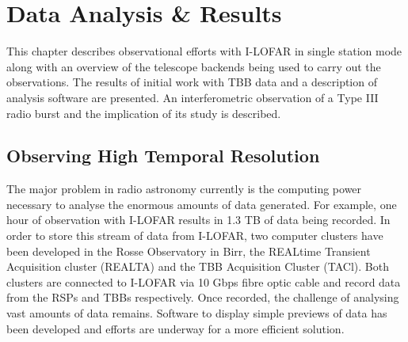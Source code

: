 
%
%



\onehalfspacing
\chapter{Data Analysis \& Results}
\label{chap:obs}
This chapter describes observational efforts with I-LOFAR in single station mode along with an overview of the telescope backends being used to carry out the observations. The results of initial work with TBB data and a description of analysis software are presented. An interferometric observation of a Type III radio burst and the implication of its study is described.   

\section{Observing High Temporal Resolution}
The major problem in radio astronomy currently is the computing power necessary to analyse the enormous amounts of data generated. For example, one hour of observation with I-LOFAR results in 1.3 TB of data being recorded. In order to store this stream of data from I-LOFAR, two computer clusters have been developed in the Rosse Observatory in Birr, the REALtime Transient Acquisition cluster (REALTA) and the TBB Acquisition Cluster (TACl). Both clusters are connected to I-LOFAR via 10 Gbps fibre optic cable and record data from the RSPs and TBBs respectively.
Once recorded, the challenge of analysing vast amounts of data remains. Software to display simple previews of data has been developed and efforts are underway for a more efficient solution.

